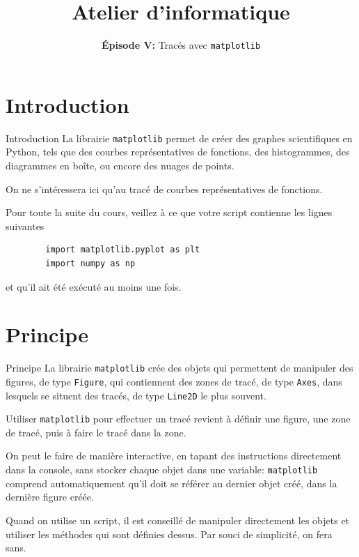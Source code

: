 \documentclass[10pt,xcolor={dvipsnames}]{beamer}
\title{Atelier d'informatique}
\subtitle{\textbf{Épisode V:} Tracés avec \lstinline|matplotlib|}
\begin{document}
\begin{frame}
	\titlepage
\end{frame}

\frame{\tableofcontents}

\section{Introduction}

\begin{frame}[fragile]{Introduction}
	La librairie \lstinline|matplotlib| permet de créer des graphes scientifiques en Python, tels que des courbes représentatives de fonctions, des histogrammes, des diagrammes en boîte, ou encore des nuages de points.\pause
	
	On ne s'intéressera ici qu'au tracé de courbes représentatives de fonctions.\pause
	
	Pour toute la suite du cours, veillez à ce que votre script contienne les lignes suivantes \begin{lstlisting}
		import matplotlib.pyplot as plt
		import numpy as np
	\end{lstlisting} et qu'il ait été exécuté au moins une fois.
\end{frame}

\section{Principe}

\begin{frame}[fragile]{Principe}
	La librairie \lstinline|matplotlib| crée des objets qui permettent de manipuler des figures, de type \lstinline|Figure|, qui contiennent des zones de tracé, de type \lstinline|Axes|, dans lesquels se situent des tracés, de type \lstinline|Line2D| le plus souvent.\pause
	
	Utiliser \lstinline|matplotlib| pour effectuer un tracé revient à définir une figure, une zone de tracé, puis à faire le tracé dans la zone.\pause
	
	On peut le faire de manière interactive, en tapant des instructions directement dans la console, sans stocker chaque objet dans une variable: \lstinline|matplotlib| comprend automatiquement qu'il doit se référer au dernier objet créé, dans la dernière figure créée.\pause
	
	Quand on utilise un script, il est conseillé de manipuler directement les objets et utiliser les méthodes qui sont définies dessus. Par souci de simplicité, on fera sans.
\end{frame}
\end{document}
